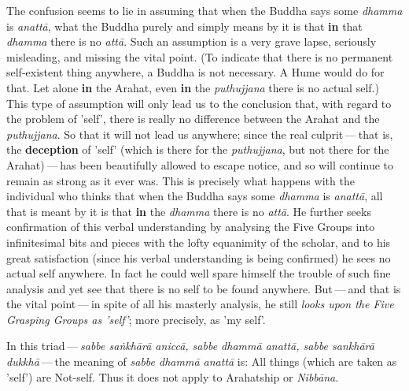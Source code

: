 The confusion seems to lie in assuming that when the Buddha says some \emph{dhamma} is \emph{anattā}, what the Buddha purely and simply means by it is that \textbf{in} that \emph{dhamma} there is no \emph{attā}. Such an assumption is a very grave lapse, seriously misleading, and missing the vital point. (To indicate that there is no permanent self-existent thing anywhere, a Buddha is not necessary. A Hume would do for that. Let alone \textbf{in} the Arahat, even \textbf{in} the \emph{puthujjana} there is no actual self.) This type of assumption will only lead us to the conclusion that, with regard to the problem of 'self', there is really no difference between the Arahat and the \emph{puthujjana}. So that it will not lead us anywhere; since the real culprit --- that is, the \textbf{deception} of 'self' (which is there for the \emph{puthujjana}, but not there for the Arahat) --- has been beautifully allowed to escape notice, and so will continue to remain as strong as it ever was. This is precisely what happens with the individual who thinks that when the Buddha says some \emph{dhamma} is \emph{anattā}, all that is meant by it is that \textbf{in} the \emph{dhamma} there is no \emph{attā}. He further seeks confirmation of this verbal understanding by analysing the Five Groups into infinitesimal bits and pieces with the lofty equanimity of the scholar, and to his great satisfaction (since his verbal understanding is being confirmed) he sees no actual self anywhere. In fact he could well spare himself the trouble of such fine analysis and yet see that there is no self to be found anywhere. But --- and that is the vital point --- in spite of all his masterly analysis, he still \emph{looks upon the Five Grasping Groups as 'self'}; more precisely, as 'my self'.

In this triad --- \emph{sabbe saṅkhārā aniccā, sabbe dhammā anattā, sabbe sankhārā dukkhā} --- the meaning of \emph{sabbe dhammā anattā} is: All things (which are taken as 'self') are Not-self. Thus it does not apply to Arahatship or \emph{Nibbāna}.

